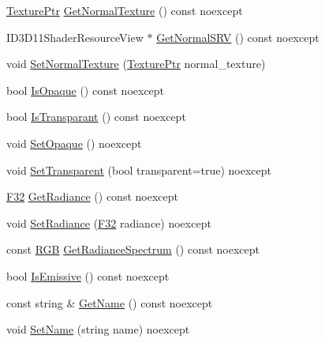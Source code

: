 \begin{DoxyCompactItemize}
\item 
\hyperlink{namespacemage_1_1rendering_a6f3ae54f825328465b0cdde0f0de4a36}{Texture\+Ptr} \hyperlink{classmage_1_1rendering_1_1_material_a1ae7786ebd627d3e7ecaf2dc671f497d}{Get\+Normal\+Texture} () const noexcept
\item 
I\+D3\+D11\+Shader\+Resource\+View $\ast$ \hyperlink{classmage_1_1rendering_1_1_material_a8617392cee8e8609671be3f4147a5934}{Get\+Normal\+S\+RV} () const noexcept
\item 
void \hyperlink{classmage_1_1rendering_1_1_material_a1a1ae2ba12c62c1d076f04124f1f64f6}{Set\+Normal\+Texture} (\hyperlink{namespacemage_1_1rendering_a6f3ae54f825328465b0cdde0f0de4a36}{Texture\+Ptr} normal\+\_\+texture)
\item 
bool \hyperlink{classmage_1_1rendering_1_1_material_af750917e67bdaf7e47129617102887ab}{Is\+Opaque} () const noexcept
\item 
bool \hyperlink{classmage_1_1rendering_1_1_material_ae60d1b61ebd38d3e329a519b2f2c3dad}{Is\+Transparant} () const noexcept
\item 
void \hyperlink{classmage_1_1rendering_1_1_material_a23741c39e6ad9a8d12b7793bc3da4131}{Set\+Opaque} () noexcept
\item 
void \hyperlink{classmage_1_1rendering_1_1_material_a8da0e0ed4df1e9ce0c7381d88b6d6c48}{Set\+Transparent} (bool transparent=true) noexcept
\item 
\hyperlink{namespacemage_aa97e833b45f06d60a0a9c4fc22ae02c0}{F32} \hyperlink{classmage_1_1rendering_1_1_material_a5bfbc1bc67731126af7cf33b286bb07b}{Get\+Radiance} () const noexcept
\item 
void \hyperlink{classmage_1_1rendering_1_1_material_ae41261db79de572b75e2615abadc2aaa}{Set\+Radiance} (\hyperlink{namespacemage_aa97e833b45f06d60a0a9c4fc22ae02c0}{F32} radiance) noexcept
\item 
const \hyperlink{structmage_1_1_r_g_b}{R\+GB} \hyperlink{classmage_1_1rendering_1_1_material_af8a3171b34409593673f1279e3f9ba29}{Get\+Radiance\+Spectrum} () const noexcept
\item 
bool \hyperlink{classmage_1_1rendering_1_1_material_acf52f6bc5f849928751e10157bdb3c3c}{Is\+Emissive} () const noexcept
\item 
const string \& \hyperlink{classmage_1_1rendering_1_1_material_ab94089dbe7d1b242fad455e9c233a78c}{Get\+Name} () const noexcept
\item 
void \hyperlink{classmage_1_1rendering_1_1_material_a5700b990bfd59c497e07ee6682ffbf06}{Set\+Name} (string name) noexcept
\end{DoxyCompactItemize}
